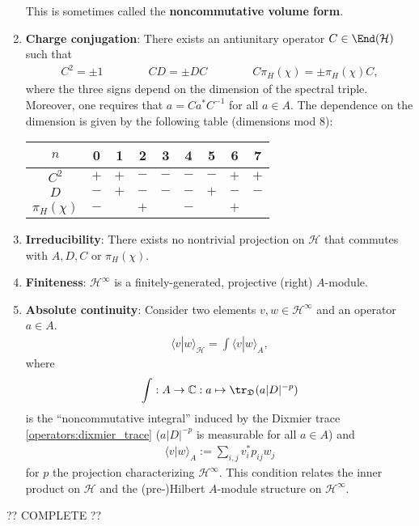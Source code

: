 \begin{remark}
\begin{enumerate}
            This is sometimes called the \textbf{noncommutative volume form}.
            \item\textbf{Charge conjugation}: There exists an antiunitary operator $C\in\End(\mathcal{H})$ such that
            \begin{gather}
                C^2=\pm1\qquad\qquad CD=\pm DC\qquad\qquad C\pi_H(\chi)=\pm\pi_H(\chi)C,
            \end{gather}
            where the three signs depend on the dimension of the spectral triple. Moreover, one requires that $a=Ca^*C^{-1}$ for all $a\in A$. The dependence on the dimension is given by the following table (dimensions mod 8):
            \begin{center}
                \begin{tabular}{|c|c|c|c|c|c|c|c|c|}
                    \hline
                    $n$&0&1&2&3&4&5&6&7\\
                    \hline
                    $C^2$&$+$&$+$&$-$&$-$&$-$&$-$&$+$&$+$\\
                    \hline
                    $D$&$-$&$+$&$-$&$-$&$-$&$+$&$-$&$-$\\
                    \hline
                    $\pi_H(\chi)$&$-$&&$+$&&$-$&&$+$&\\
                    \hline
                \end{tabular}
            \end{center}
            \item\textbf{Irreducibility}: There exists no nontrivial projection on $\mathcal{H}$ that commutes with $A,D,C$ or $\pi_H(\chi)$.
            \item\textbf{Finiteness}: $\mathcal{H}^\infty$ is a finitely-generated, projective (right) $A$-module.
            \item\textbf{Absolute continuity}: Consider two elements $v,w\in\mathcal{H}^\infty$ and an operator $a\in A$.
                \begin{gather}
                    \langle v|w \rangle_\mathcal{H} = \int\langle v|w \rangle_A,
                \end{gather}
                where
                \begin{gather}
                    \int:A\rightarrow\mathbb{C}:a\mapsto\tr_\mathfrak{D}(a|D|^{-p})
                \end{gather}
                is the ``noncommutative integral'' induced by the Dixmier trace \ref{operators:dixmier_trace} ($a|D|^{-p}$ is measurable for all $a\in A$) and
                \begin{gather}
                    \langle v|w \rangle_A := \sum_{i,j} v^*_ip_{ij}w_j
                \end{gather}
                for $p$ the projection characterizing $\mathcal{H}^\infty$. This condition relates the inner product on $\mathcal{H}$ and the (pre-)Hilbert $A$-module structure on $\mathcal{H}^\infty$.
        \end{enumerate}
        ?? COMPLETE ??
    \end{remark}

